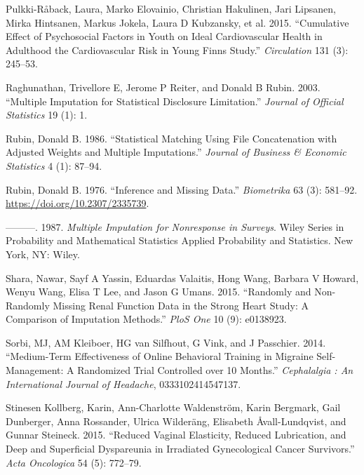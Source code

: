 \documentclass[
]{article}
\newlength{\cslhangindent}
\newlength{\cslentryspacingunit} %
\newenvironment{CSLReferences}[2] %
 {%
  \setlength{\parindent}{0pt}
  \ifodd #1
  \let\oldpar\par
  \def\par{\hangindent=\cslhangindent\oldpar}
  \fi
  \setlength{\parskip}{#2\cslentryspacingunit}
 }%
 {}
\begin{document}
\begin{CSLReferences}{1}{0}
\leavevmode{}%
Pulkki-Råback, Laura, Marko Elovainio, Christian Hakulinen, Jari
Lipsanen, Mirka Hintsanen, Markus Jokela, Laura D Kubzansky, et al.
2015. {``Cumulative Effect of Psychosocial Factors in Youth on Ideal
Cardiovascular Health in Adulthood the Cardiovascular Risk in Young
Finns Study.''} \emph{Circulation} 131 (3): 245--53.

\leavevmode{}%
Raghunathan, Trivellore E, Jerome P Reiter, and Donald B Rubin. 2003.
{``Multiple Imputation for Statistical Disclosure Limitation.''}
\emph{Journal of Official Statistics} 19 (1): 1.

\leavevmode{}%
Rubin, Donald B. 1986. {``Statistical Matching Using File Concatenation
with Adjusted Weights and Multiple Imputations.''} \emph{Journal of
Business \& Economic Statistics} 4 (1): 87--94.

\leavevmode{}%
Rubin, Donald B. 1976. {``Inference and {Missing Data}.''}
\emph{Biometrika} 63 (3): 581--92.
\url{https://doi.org/10.2307/2335739}.

\leavevmode{}%
---------. 1987. \emph{Multiple {Imputation} for Nonresponse in
Surveys}. Wiley Series in Probability and Mathematical Statistics
{Applied} Probability and Statistics. {New York, NY}: {Wiley}.

\leavevmode{}%
Shara, Nawar, Sayf A Yassin, Eduardas Valaitis, Hong Wang, Barbara V
Howard, Wenyu Wang, Elisa T Lee, and Jason G Umans. 2015. {``Randomly
and Non-Randomly Missing Renal Function Data in the Strong Heart Study:
A Comparison of Imputation Methods.''} \emph{PloS One} 10 (9): e0138923.

\leavevmode{}%
Sorbi, MJ, AM Kleiboer, HG van Silfhout, G Vink, and J Passchier. 2014.
{``Medium-Term Effectiveness of Online Behavioral Training in Migraine
Self-Management: {A} Randomized Trial Controlled over 10 Months.''}
\emph{Cephalalgia : An International Journal of Headache},
0333102414547137.

\leavevmode{}%
Stinesen Kollberg, Karin, Ann-Charlotte Waldenström, Karin Bergmark,
Gail Dunberger, Anna Rossander, Ulrica Wilderäng, Elisabeth
Åvall-Lundqvist, and Gunnar Steineck. 2015. {``Reduced Vaginal
Elasticity, Reduced Lubrication, and Deep and Superficial Dyspareunia in
Irradiated Gynecological Cancer Survivors.''} \emph{Acta Oncologica} 54
(5): 772--79.


\end{CSLReferences}
\end{document}
